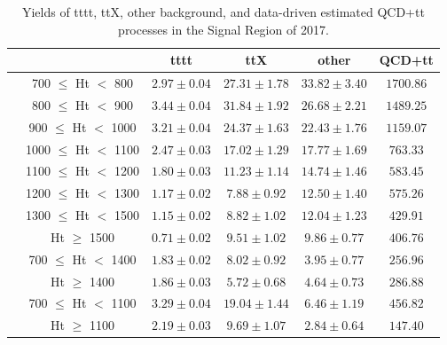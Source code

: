 \documentclass[twoside]{article}
\begin{document}
\begin{table}[h!]
\centering
\begin{adjustbox}{width=\textwidth}
\begin{tabular}{>{\raggedright\arraybackslash}p{3cm}ccccc}
\toprule
 & & \textbf{tttt} & \textbf{ttX} & \textbf{other} & \textbf{QCD+tt} \\
\midrule
\multirow{8}{*}{$N_{RT}=1, N_{BT}=0$} 
 & 700 $\leq$ Ht $<$ 800 & $2.97 \pm 0.04$ & $27.31 \pm 1.78$ & $33.82 \pm 3.40$ & $1700.86$ \\
 & 800 $\leq$ Ht $<$ 900 & $3.44 \pm 0.04$ & $31.84 \pm 1.92$ & $26.68 \pm 2.21$ & $1489.25$ \\
 & 900 $\leq$ Ht $<$ 1000 & $3.21 \pm 0.04$ & $24.37 \pm 1.63$ & $22.43 \pm 1.76$ & $1159.07$ \\
 & 1000 $\leq$ Ht $<$ 1100 & $2.47 \pm 0.03$ & $17.02 \pm 1.29$ & $17.77 \pm 1.69$ & $763.33$ \\
 & 1100 $\leq$ Ht $<$ 1200 & $1.80 \pm 0.03$ & $11.23 \pm 1.14$ & $14.74 \pm 1.46$ & $583.45$ \\
 & 1200 $\leq$ Ht $<$ 1300 & $1.17 \pm 0.02$ & $7.88 \pm 0.92$ & $12.50 \pm 1.40$ & $575.26$ \\
 & 1300 $\leq$ Ht $<$ 1500 & $1.15 \pm 0.02$ & $8.82 \pm 1.02$ & $12.04 \pm 1.23$ & $429.91$ \\
 & Ht $\geq$ 1500 & $0.71 \pm 0.02$ & $9.51 \pm 1.02$ & $9.86 \pm 0.77$ & $406.76$ \\
\midrule
\multirow{2}{*}{$N_{RT}=1, N_{BT}\geq1$} 
 & 700 $\leq$ Ht $<$ 1400 & $1.83 \pm 0.02$ & $8.02 \pm 0.92$ & $3.95 \pm 0.77$ & $256.96$ \\
 & Ht $\geq$ 1400 & $1.86 \pm 0.03$ & $5.72 \pm 0.68$ & $4.64 \pm 0.73$ & $286.88$ \\
\midrule
\multirow{2}{*}{$N_{RT}\geq2$} 
 & 700 $\leq$ Ht $<$ 1100 & $3.29 \pm 0.04$ & $19.04 \pm 1.44$ & $6.46 \pm 1.19$ & $456.82$ \\
 & Ht $\geq$ 1100 & $2.19 \pm 0.03$ & $9.69 \pm 1.07$ & $2.84 \pm 0.64$ & $147.40$ \\
\bottomrule
\end{tabular}
\end{adjustbox}
\caption{Yields of tttt, ttX, other background, and data-driven estimated QCD+tt processes in the Signal Region of 2017.}
\label{fig:yield2017}
\end{table}
\end{document}
